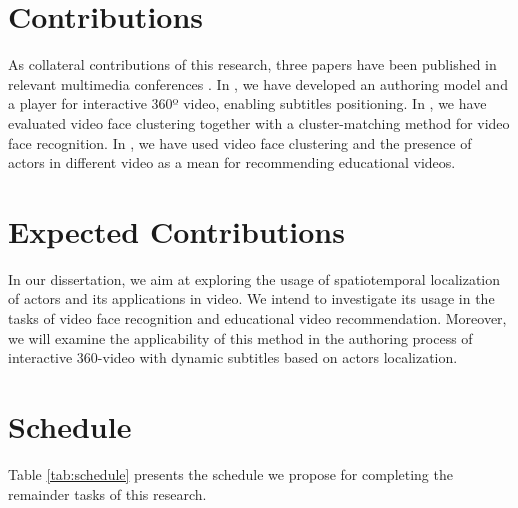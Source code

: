 \section{Contributions}
\label{sec_contritutions}
 As collateral contributions of this research, three papers have been published in relevant multimedia conferences \cite{mendes2020cluster, mendes2020authoring, mendes2020ISM}. In \cite{mendes2020authoring}, we have developed an authoring model and a player for interactive 360º video, enabling subtitles positioning. In \cite{mendes2020cluster}, we have evaluated video face clustering together with a cluster-matching method for video face recognition. In \cite{mendes2020ISM}, we have used video face clustering and the presence of actors in different video as a mean for recommending educational videos.
 
\section{Expected Contributions}
\label{sec_expected}
In our dissertation, we aim at exploring the usage of spatiotemporal localization of actors and its applications in video. We intend to investigate its usage in the tasks of video face recognition and educational video recommendation. Moreover, we will examine the applicability of this method in the authoring process of interactive 360-video with dynamic subtitles based on actors localization.


\section{Schedule}
\label{sec_schedule}
Table \ref{tab:schedule} presents the schedule we propose for completing the remainder tasks of this research.

